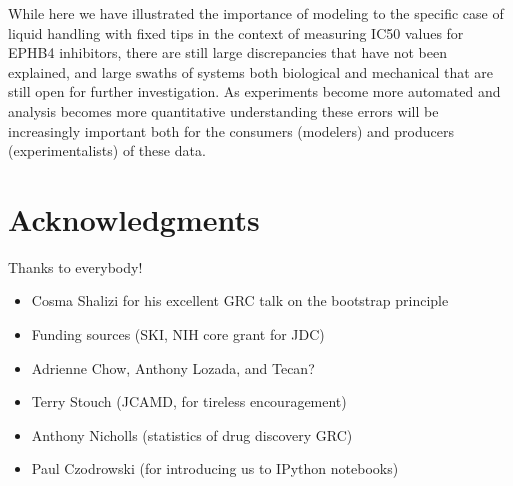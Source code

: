 \documentclass[aps,pre,twocolumn,nofootinbib,superscriptaddress,linenumbers]{revtex4-1}
\begin{document}
While here we have illustrated the importance of modeling to the specific case of liquid handling with fixed tips in the context of measuring IC50 values for EPHB4 inhibitors, there are still large discrepancies that have not been explained, and large swaths of systems both biological and mechanical that are still open for further investigation. 
As experiments become more automated and analysis becomes more quantitative understanding these errors will be increasingly important both for the consumers (modelers) and producers (experimentalists) of these data.


\section{Acknowledgments}
\label{section:acknowledgments}

Thanks to everybody!

\begin{itemize}
  \item Cosma Shalizi for his excellent GRC talk on the bootstrap principle
  \item Funding sources (SKI, NIH core grant for JDC)
  \item Adrienne Chow, Anthony Lozada, and Tecan?
  \item Terry Stouch (JCAMD, for tireless encouragement)
  \item Anthony Nicholls (statistics of drug discovery GRC)
  \item Paul Czodrowski (for introducing us to IPython notebooks)
\end{itemize}


 

\end{document}

